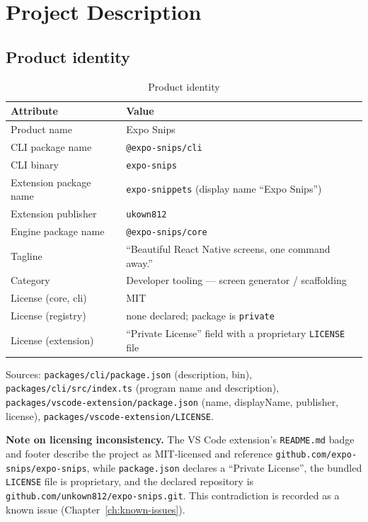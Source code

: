 \chapter{Project Description}
\label{ch:project-description}

\section{Product identity}

\begin{longtable}{p{4.4cm}p{10cm}}
\caption{Product identity}\\
\toprule
\textbf{Attribute} & \textbf{Value} \\
\midrule

Product name & Expo Snips \\
CLI package name & \texttt{@expo-snips/cli} \\
CLI binary & \texttt{expo-snips} \\
Extension package name & \texttt{expo-snippets} (display name ``Expo Snips'') \\
Extension publisher & \texttt{ukown812} \\
Engine package name & \texttt{@expo-snips/core} \\
Tagline & ``Beautiful React Native screens, one command away.'' \\
Category & Developer tooling --- screen generator / scaffolding \\
License (core, cli) & MIT \\
License (registry) & none declared; package is \texttt{private} \\
License (extension) & ``Private License'' field with a proprietary \texttt{LICENSE} file \\
\bottomrule
\end{longtable}

Sources: \texttt{packages/cli/package.json} (description, bin),
\texttt{packages/cli/src/index.ts} (program name and description),
\texttt{packages/vscode-extension/package.json} (name, displayName, publisher,
license), \texttt{packages/vscode-extension/LICENSE}.

\textbf{Note on licensing inconsistency.} The VS Code extension's
\texttt{README.md} badge and footer describe the project as MIT-licensed and
reference \texttt{github.com/expo-snips/expo-snips}, while
\texttt{package.json} declares a ``Private License'', the bundled \texttt{LICENSE}
file is proprietary, and the declared repository is
\texttt{github.com/unkown812/expo-snips.git}. This contradiction is recorded as a
known issue (Chapter~\ref{ch:known-issues}).

